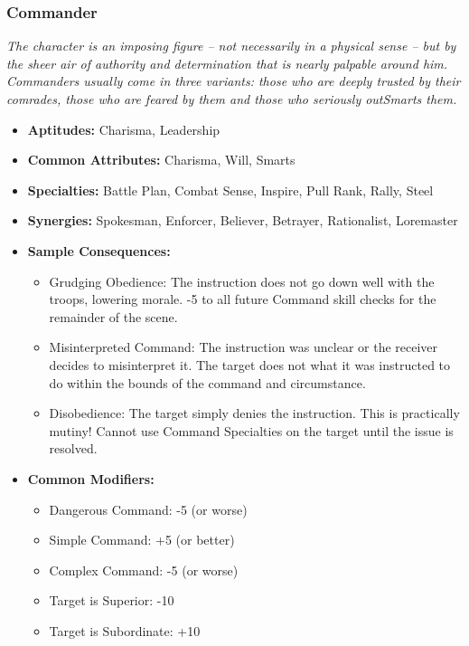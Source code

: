 \subsubsection{Commander}\label{Commander}
\textit{The character is an imposing figure – not necessarily in a physical sense – but by the sheer air of authority and determination that is nearly palpable around him.
Commanders usually come in three variants: those who are deeply trusted by their comrades, those who are feared by them and those who seriously outSmarts them.}
\begin{itemize}
	\item \textbf{Aptitudes:} Charisma, Leadership
	\item \textbf{Common Attributes:} Charisma, Will, Smarts
	\item \textbf{Specialties:} Battle Plan, Combat Sense, Inspire, Pull Rank, Rally, Steel
	\item \textbf{Synergies:} Spokesman, Enforcer, Believer, Betrayer, Rationalist, Loremaster
	\item \textbf{Sample Consequences:} 
	\begin{itemize}
		\item Grudging Obedience: The instruction does not go down well with the troops, lowering morale. -5 to all future Command skill checks for the remainder of the scene.
		\item Misinterpreted Command: The instruction was unclear or the receiver decides to misinterpret it. The target does not what it was instructed to do within the bounds of the command and circumstance.
		\item Disobedience: The target simply denies the instruction. This is practically mutiny! Cannot use Command Specialties on the target until the issue is resolved.
	\end{itemize}
	\item \textbf{Common Modifiers:}
	\begin{itemize}
		\item Dangerous Command: -5 (or worse)
		\item Simple Command: +5 (or better)
		\item Complex Command: -5 (or worse)
		\item Target is Superior: -10
		\item Target is Subordinate: +10
	\end{itemize}
\end{itemize}

